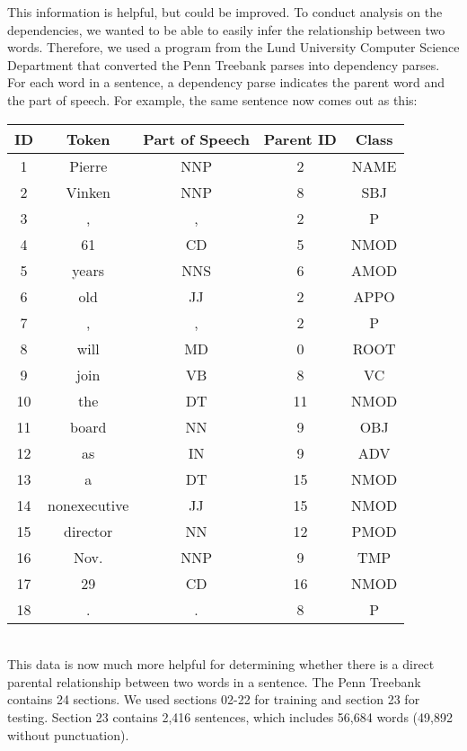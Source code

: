\documentclass[12pt,fleqn]{amsart}
\begin{document}
This information is helpful, but could be improved. To conduct analysis on the dependencies, we wanted to be able to easily infer the relationship between two words. Therefore, we used a program from the Lund University Computer Science Department that converted the Penn Treebank parses into dependency parses. For each word in a sentence, a dependency parse indicates the parent word and the part of speech. For example, the same sentence now comes out as this:
\\

        \begin{tabular}{|ccccc|}
            ID & Token & Part of Speech & Parent ID & Class \\ 
            \hline
            1 &Pierre & NNP & 2 & NAME \\
            2 & Vinken & NNP & 8 & SBJ\\
            3 & , & , & 2 & P\\
            4 & 61 & CD & 5 & NMOD\\
            5 & years & NNS & 6 & AMOD\\
            6 & old & JJ & 2 & APPO\\
            7 & , & , & 2 & P\\
            8 & will & MD & 0 & ROOT\\
            9 & join & VB & 8 & VC\\
            10 & the & DT & 11 & NMOD\\
            11 & board & NN & 9 & OBJ\\
            12 & as & IN & 9 & ADV\\
            13 & a & DT & 15 & NMOD\\
            14 & nonexecutive & JJ & 15 & NMOD\\
            15 & director & NN & 12 & PMOD\\
            16 & Nov. & NNP & 9 & TMP\\
            17 & 29 & CD & 16 & NMOD\\
            18 & . & . & 8 & P\\
            \hline
        \end{tabular} \\


This data is now much more helpful for determining whether there is a direct parental relationship between two words in a sentence. The Penn Treebank contains 24 sections. We used sections 02-22 for training and section 23 for testing. Section 23 contains 2,416 sentences, which includes 56,684 words (49,892 without punctuation).
\end{document}
